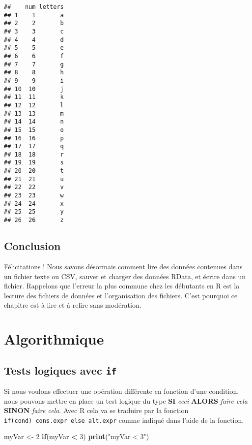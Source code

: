 \documentclass[]{book}
\newenvironment{Shaded}{\begin{snugshade}}{\end{snugshade}}
\newcommand{\KeywordTok}[1]{\textcolor[rgb]{0.13,0.29,0.53}{\textbf{#1}}}
\newcommand{\DecValTok}[1]{\textcolor[rgb]{0.00,0.00,0.81}{#1}}
\newcommand{\StringTok}[1]{\textcolor[rgb]{0.31,0.60,0.02}{#1}}
\newcommand{\ControlFlowTok}[1]{\textcolor[rgb]{0.13,0.29,0.53}{\textbf{#1}}}
\newcommand{\OperatorTok}[1]{\textcolor[rgb]{0.81,0.36,0.00}{\textbf{#1}}}
\newcommand{\NormalTok}[1]{#1}
\theoremstyle{definition}
\theoremstyle{definition}
\theoremstyle{definition}
\theoremstyle{remark}
\begin{document}
\begin{verbatim}
##    num letters
## 1    1       a
## 2    2       b
## 3    3       c
## 4    4       d
## 5    5       e
## 6    6       f
## 7    7       g
## 8    8       h
## 9    9       i
## 10  10       j
## 11  11       k
## 12  12       l
## 13  13       m
## 14  14       n
## 15  15       o
## 16  16       p
## 17  17       q
## 18  18       r
## 19  19       s
## 20  20       t
## 21  21       u
## 22  22       v
## 23  23       w
## 24  24       x
## 25  25       y
## 26  26       z
\end{verbatim}

\section{Conclusion}\label{conclusion-5}

Félicitations ! Nous savons désormais comment lire des données contenues
dans un fichier texte ou CSV, sauver et charger des données RData, et
écrire dans un fichier. Rappelons que l'erreur la plus commune chez les
débutants en R est la lecture des fichiers de données et l'organisation
des fichiers. C'est pourquoi ce chapitre est à lire et à relire sans
modération.

\chapter{Algorithmique}\label{algo}

\hypertarget{l17if}{\section{\texorpdfstring{Tests logiques avec
\texttt{if}}{Tests logiques avec if}}\label{l17if}}

Si nous voulons effectuer une opération différente en fonction d'une
condition, nous pouvons mettre en place un test logique du type
\textbf{SI} \emph{ceci} \textbf{ALORS} \emph{faire cela} \textbf{SINON}
\emph{faire cela}. Avec R cela va se traduire par la fonction
\texttt{if(cond)\ cons.expr\ else\ alt.expr} comme indiqué dans l'aide
de la fonction.

\begin{Shaded}
\begin{Highlighting}[]
\NormalTok{myVar <-}\StringTok{ }\DecValTok{2}
\ControlFlowTok{if}\NormalTok{(myVar }\OperatorTok{<}\StringTok{ }\DecValTok{3}\NormalTok{) }\KeywordTok{print}\NormalTok{(}\StringTok{"myVar < 3"}\NormalTok{)}
\end{Highlighting}
\end{Shaded}
\end{document}
